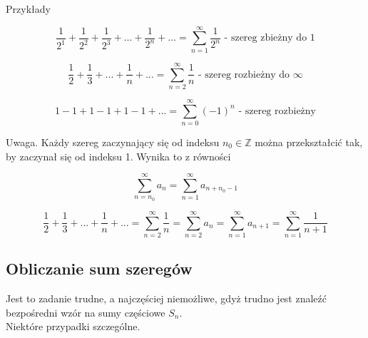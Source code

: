 Przykłady

$$ \frac{1}{2^1} + \frac{1}{2^2} + \frac{1}{2^3} + ... + \frac{1}{2^n} + ... = \sum\limits_{n = 1}^{\infty} \frac{1}{2^n} 
\textrm { - szereg zbieżny do 1}$$

$$ \frac{1}{2} + \frac{1}{3} + ... + \frac{1}{n} + ... = \sum\limits_{n = 2}^{\infty} \frac{1}{n} 
\textrm { - szereg rozbieżny do } \infty$$

$$ 1 - 1 + 1 - 1 + 1 - 1 + ... = \sum\limits_{n = 0}^{\infty} (-1)^n \textrm{ - szereg rozbieżny} $$

Uwaga. Każdy szereg zaczynający się od indeksu $ n_0 \in \mathbb{Z} $ można przekształcić tak, by zaczynał się od indeksu 1.
Wynika to z równości

$$ \sum\limits_{n = n_0}^{\infty} a_n = \sum\limits_{n = 1}^{\infty} a_{n + n_0 - 1} $$

$$ \frac{1}{2} + \frac{1}{3} + ... + \frac{1}{n} + ... = \sum\limits_{n = 2}^{\infty} \frac{1}{n} = \sum\limits_{n = 2}^{\infty} a_n
= \sum\limits_{n = 1}^{\infty} a_{n + 1} = \sum\limits_{n = 1}^{\infty} \frac{1}{n + 1} $$

\subsection*{Obliczanie sum szeregów}

Jest to zadanie trudne, a najczęściej niemożliwe, gdyż trudno jest znaleźć bezpośredni wzór na sumy częściowe $S_n$. \\

Niektóre przypadki szczególne.

